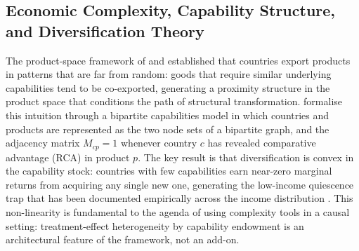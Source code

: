 \subsection{Economic Complexity, Capability Structure, and Diversification Theory}
\label{subsec:lit_efc}

The product-space framework of \citet{hausmann2007} and \citet{hidalgo2009}
established that countries export products in patterns that are far from random:
goods that require similar underlying capabilities tend to be co-exported, generating
a proximity structure in the product space that conditions the path of structural
transformation. \citet{hidalgo2011} formalise this intuition through a bipartite
capabilities model in which countries and products are represented as the two node
sets of a bipartite graph, and the adjacency matrix $M_{cp}=1$ whenever country $c$
has revealed comparative advantage (RCA) in product $p$. The key result is that
diversification is convex in the capability stock: countries with few capabilities
earn near-zero marginal returns from acquiring any single new one, generating the
low-income quiescence trap that has been documented empirically across the
income distribution \citep{hausmann2007}. This non-linearity is fundamental to the
agenda of using complexity tools in a causal setting: treatment-effect heterogeneity
by capability endowment is an architectural feature of the framework, not an
add-on.

